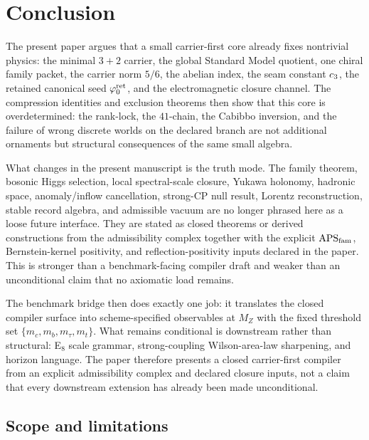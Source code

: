 \section{Conclusion}

The present paper argues that a small carrier-first core already fixes nontrivial physics: the minimal $3+2$ carrier, the global Standard Model quotient, one chiral family packet, the carrier norm $5/6$, the abelian index, the seam constant $c_3$, the retained canonical seed $\varphi_0^{\mathrm{ret}}$, and the electromagnetic closure channel. The compression identities and exclusion theorems then show that this core is overdetermined: the rank-lock, the $41$-chain, the Cabibbo inversion, and the failure of wrong discrete worlds on the declared branch are not additional ornaments but structural consequences of the same small algebra.

What changes in the present manuscript is the truth mode. The family theorem, bosonic Higgs selection, local spectral-scale closure, Yukawa holonomy, hadronic space, anomaly/inflow cancellation, strong-CP null result, Lorentz reconstruction, stable record algebra, and admissible vacuum are no longer phrased here as a loose future interface. They are stated as closed theorems or derived constructions from the admissibility complex together with the explicit $\mathrm{APS}_{\mathrm{fam}}$, Bernstein-kernel positivity, and reflection-positivity inputs declared in the paper. This is stronger than a benchmark-facing compiler draft and weaker than an unconditional claim that no axiomatic load remains.

The benchmark bridge then does exactly one job: it translates the closed compiler surface into scheme-specified observables at $M_Z$ with the fixed threshold set $\{m_c,m_b,m_\tau,m_t\}$. What remains conditional is downstream rather than structural: E$_8$ scale grammar, strong-coupling Wilson-area-law sharpening, and horizon language. The paper therefore presents a closed carrier-first compiler from an explicit admissibility complex and declared closure inputs, not a claim that every downstream extension has already been made unconditional.

\subsection{Scope and limitations}

